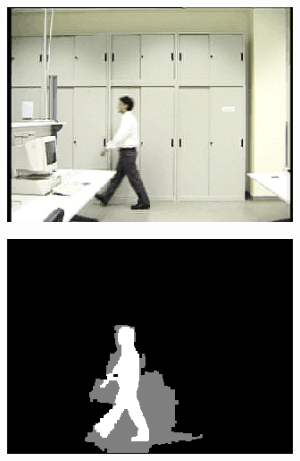 \begin{figure}
  \centering
  \begin{subfigure}{.49\linewidth}
  \includegraphics[width=1\linewidth]{figures/lab_0161.jpg}
\end{subfigure}
\hfill
\begin{subfigure}{.49\linewidth}
  \includegraphics[width=1\linewidth]{figures/lab_gt_0161.jpg}
\end{subfigure}
\hfill
  \begin{subfigure}{.49\linewidth}

\end{subfigure}
\end{figure}
